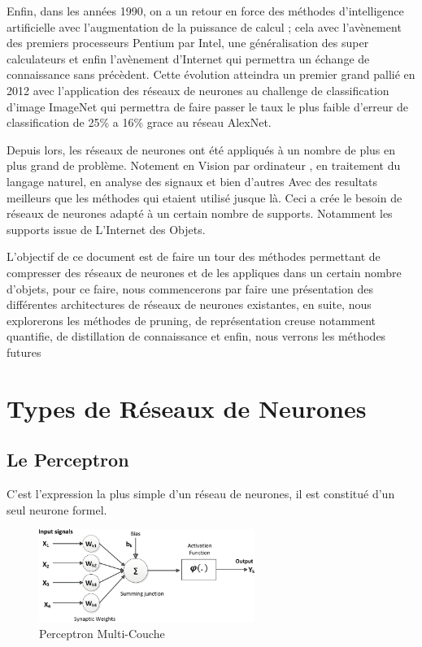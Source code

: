 \documentclass[twoside,twocolumn]{article}
\begin{document}
Enfin, dans les années 1990, on a un retour en force des méthodes d'intelligence artificielle avec l'augmentation de la puissance de calcul ; cela avec l'avènement
des premiers processeurs Pentium par Intel, une généralisation des super calculateurs et enfin l'avènement d'Internet qui permettra un échange de connaissance
sans précèdent. Cette évolution atteindra un premier grand pallié en 2012 avec l'application des réseaux de neurones au challenge de classification d'image ImageNet
qui permettra de faire passer le taux le plus faible d'erreur de classification de 25\% a 16\% grace au réseau AlexNet\cite{Rajat1}. 

Depuis lors, les réseaux de neurones ont été appliqués à un nombre de plus en plus grand de problème. Notement en Vision par ordinateur\cite{MadhusmitaSahu}
\cite{Sornaminproceedings}, en traitement du langage naturel\cite{jing2019survey}, en analyse des signaux\cite{MohamedIbn1}\cite{XiaofanLi1} et bien d'autres
\cite{POZNYAK2019250} Avec des resultats meilleurs que les méthodes qui etaient utilisé jusque là. Ceci a crée le besoin de réseaux de neurones adapté à un certain 
nombre de supports. Notamment les supports issue de L'Internet des Objets. 

L'objectif de ce document est de faire un tour des méthodes permettant de compresser des réseaux de neurones et de les appliques dans un certain nombre d'objets, 
pour ce faire, nous commencerons par faire une présentation des différentes architectures de réseaux de neurones existantes, en suite, nous explorerons les méthodes 
de pruning, de représentation creuse notamment quantifie, de distillation de connaissance et enfin, nous verrons les méthodes futures 


\section{Types de Réseaux de Neurones}

\subsection{Le Perceptron}

C'est l'expression la plus simple d'un réseau de neurones, il est constitué d'un seul neurone formel\cite{warren1}.

\begin{figure}[h]
  \centering
  \includegraphics[width=70mm]{McCulloch-Pitts-computational-model-of-a-neuron.png}
  \caption{Perceptron Multi-Couche}
  \label{PerceptronMathematique}
\end{figure}
\end{document}
